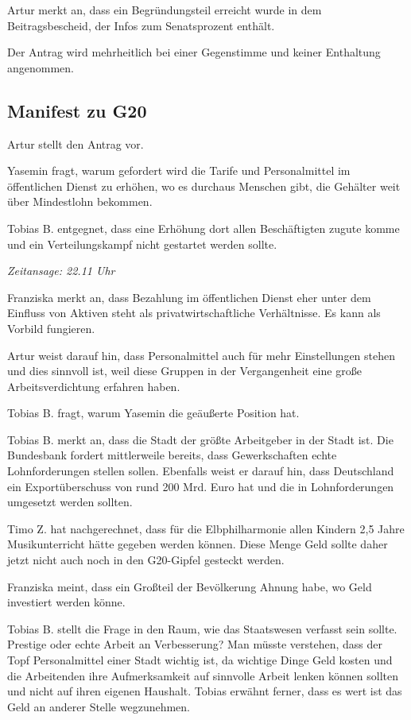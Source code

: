 \documentclass[ngerman,headheight=70pt]{scrartcl}
\begin{document}
    Artur merkt an, dass ein Begründungsteil erreicht wurde in dem Beitragsbescheid,
    der Infos zum Senatsprozent enthält.

    Der Antrag wird mehrheitlich bei einer Gegenstimme und keiner Enthaltung
    angenommen.

    \subsection{Manifest zu G20}

    Artur stellt den Antrag vor.

    Yasemin fragt, warum gefordert wird die Tarife und Personalmittel im
    öffentlichen Dienst zu erhöhen, wo es durchaus Menschen gibt, die Gehälter
    weit über Mindestlohn bekommen.

    Tobias B. entgegnet, dass eine Erhöhung dort allen Beschäftigten zugute komme
    und ein Verteilungskampf nicht gestartet werden sollte.

    \textit{Zeitansage: 22.11 Uhr}

    Franziska merkt an, dass Bezahlung im öffentlichen Dienst eher unter dem Einfluss
    von Aktiven steht als privatwirtschaftliche Verhältnisse. Es kann als Vorbild
    fungieren.

    Artur weist darauf hin, dass Personalmittel auch für mehr Einstellungen
    stehen und dies sinnvoll ist, weil diese Gruppen in der Vergangenheit eine
    große Arbeitsverdichtung erfahren haben.

    Tobias B. fragt, warum Yasemin die geäußerte Position hat.

    Tobias B. merkt an, dass die Stadt der größte Arbeitgeber in der Stadt ist.
    Die Bundesbank fordert mittlerweile bereits, dass Gewerkschaften echte
    Lohnforderungen stellen sollen. Ebenfalls weist er darauf hin, dass Deutschland
    ein Exportüberschuss von rund 200 Mrd. Euro hat und die in Lohnforderungen
    umgesetzt werden sollten.

    Timo Z. hat nachgerechnet, dass für die Elbphilharmonie allen Kindern 2,5 Jahre
    Musikunterricht hätte gegeben werden können. Diese Menge Geld sollte daher
    jetzt nicht auch noch in den G20-Gipfel gesteckt werden.

    Franziska meint, dass ein Großteil der Bevölkerung Ahnung habe, wo Geld
    investiert werden könne.

    Tobias B. stellt die Frage in den Raum, wie das Staatswesen verfasst sein
    sollte. Prestige oder echte Arbeit an Verbesserung? Man müsste verstehen, dass
    der Topf Personalmittel einer Stadt wichtig ist, da wichtige Dinge Geld
    kosten und die Arbeitenden ihre Aufmerksamkeit auf sinnvolle Arbeit lenken
    können sollten und nicht auf ihren eigenen Haushalt.
    Tobias erwähnt ferner, dass es wert ist das Geld an anderer Stelle wegzunehmen.
\end{document}
